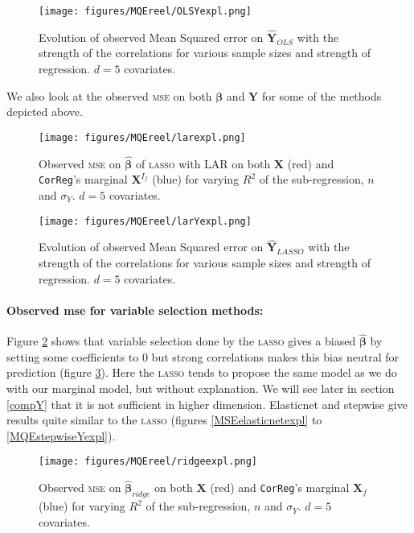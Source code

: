 \documentclass[12pt,a4paper]{report}
\begin{document}
	 \begin{figure}
	 \centering
	  \texttt{[image: figures/MQEreel/OLSYexpl.png]}
	  \caption{Evolution of observed Mean Squared error on $\hat{\boldsymbol{Y}}_{OLS}$ with the strength of the correlations for various sample sizes and strength of regression. $d=5$ covariates. } \label{MQEOLSYexpl}
	\end{figure}

	
	We also look at the observed \textsc{mse} on both $\boldsymbol{\beta}$ and $\boldsymbol{Y}$ for some of the methods depicted above.
	
 \begin{figure}[h!]
	\texttt{[image: figures/MQEreel/larexpl.png]}
	\caption{Observed \textsc{mse} on $\hat{\boldsymbol{\beta}}$ of \textsc{lasso} with LAR on both $\boldsymbol{X}$ (red) and {\tt CorReg}'s marginal $\boldsymbol{X}^{I_f}$ (blue) for varying $R^2$ of the sub-regression, $n$ and $\sigma_Y$. $d=5$ covariates.}\label{MSElarexpl}
\end{figure} 
	
	 \begin{figure}
	 \centering
	  \texttt{[image: figures/MQEreel/larYexpl.png]}
	  \caption{Evolution of observed Mean Squared error on $\hat{\boldsymbol{Y}}_{LASSO}$ with the strength of the correlations for various sample sizes and strength of regression. $d=5$ covariates. } \label{MQElarYexpl}
	\end{figure}
	
		\paragraph{Observed {\sc mse} for variable selection methods:}
	Figure \ref{MSElarexpl} shows that variable selection done by the \textsc{lasso} gives a biased $\hat{\boldsymbol{\beta}}$ by setting some coefficients to 0 but strong correlations makes this bias neutral for prediction (figure \ref{MQElarYexpl}). Here the \textsc{lasso} tends to propose the same model as we do  with our marginal model, but without explanation. We will see  later in section \ref{compY} that it is not sufficient in higher dimension. Elasticnet and stepwise give results quite similar to the \textsc{lasso} (figures \ref{MSEelasticnetexpl} to \ref{MQEstepwiseYexpl}). \\
	\begin{figure}[h!]
	\texttt{[image: figures/MQEreel/ridgeexpl.png]}
	\caption{Observed \textsc{mse} on $\hat{\boldsymbol{\beta}}_{ridge}$ on both $\boldsymbol{X}$ (red) and {\tt CorReg}'s marginal $\boldsymbol{X}_f$ (blue) for varying $R^2$ of the sub-regression, $n$ and $\sigma_Y$. $d=5$ covariates.}\label{MSEridgexpl}
\end{figure} 
	
\end{document}
